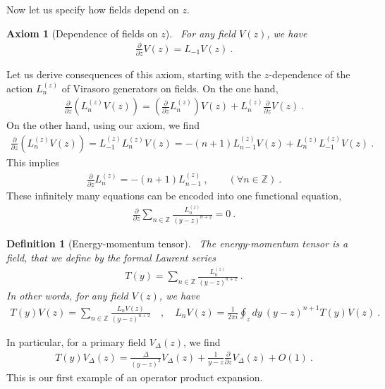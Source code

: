 \documentclass[12pt, a4paper]{article}
\theoremstyle{break}
\newtheorem{hyp}[exo]{Axiom}
\newtheorem{defn}[exo]{Definition}
\begin{document}
Now let us specify how fields depend on $z$. 

\begin{hyp}[Dependence of fields on $z$]
 ~\label{hyp:geom}
 For any field $V(z)$, we have 
 \begin{align}
  \frac{\partial}{\partial z} V(z) = L_{-1} V(z)  \ .
  \label{pvlv}
 \end{align}
\end{hyp}

Let us derive consequences of this axiom, starting with the $z$-dependence of the action $L_n^{(z)}$ of Virasoro generators on fields. On the one hand,
\begin{align}
 \frac{\partial}{\partial z} \left( L_n^{(z)} V(z) \right) = \left(\frac{\partial}{\partial z} L_n^{(z)}\right) V(z) + L_n^{(z)} \frac{\partial}{\partial z} V(z)\ .
\end{align}
On the other hand, using our axiom, we find 
\begin{align}
 \frac{\partial}{\partial z} \left( L_n^{(z)} V(z) \right) = L_{-1}^{(z)} L_n^{(z)} V(z) = -(n+1)L_{n-1}^{(z)} V(z) + L_n^{(z)} L_{-1}^{(z)} V(z)\ .
\end{align}
This implies 
\begin{align}
 \frac{\partial}{\partial z} L_n^{(z)} = -(n+1)L_{n-1}^{(z)}\ ,\qquad (\forall n\in\mathbb{Z})\ .
\end{align}
These infinitely many equations can be encoded into one functional equation,
\begin{align}
 \frac{\partial}{\partial z} \sum_{n\in\mathbb{Z}} \frac{L_n^{(z)}}{(y-z)^{n+2}} = 0\ .
\end{align}

\begin{defn}[Energy-momentum tensor]
 ~\label{def:em}
 The energy-momentum tensor is a field, that we define by the formal Laurent series
 \begin{align}
  T(y) = \sum_{n\in\mathbb{Z}} \frac{L_n^{(z)}}{(y-z)^{n+2}} \ .
 \end{align}
In other words, for any field $V(z)$, we have 
\begin{align}
 T(y)V(z) = \sum_{n\in\mathbb{Z}} \frac{L_n V(z)}{(y-z)^{n+2}}\quad , \quad L_n V(z) = \frac{1}{2\pi i} \oint_{z}dy\ (y-z)^{n+1} T(y)V(z)\ .
 \label{eq:lvtv}
\end{align}
\end{defn}
In particular, for a primary field $V_\Delta(z)$, we find 
\begin{align}
 T(y)V_\Delta(z) = \frac{\Delta}{(y-z)^2} V_\Delta(z) + \frac{1}{y-z} \frac{\partial}{\partial z} V_\Delta(z) + O(1)\ . 
 \label{eq:tvd}
\end{align}
This is our first example of an operator product expansion.
\end{document}
